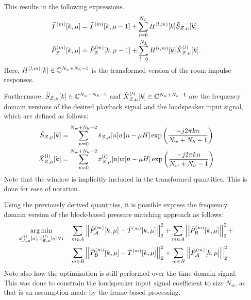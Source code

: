 This results in the following expressions.
\begin{align}
    \tilde{T}^{(m)}[k, \mu] &= \tilde{T}^{(m)}[k, \mu - 1] + \sum_{l=0}^{N_L}H^{(l,m)}[k]\tilde{S}_{\mathcal{Z},\mu}[k],\label{eq:perceptual_sound_zones:stft:t_freq} \\
    \tilde{P}_{\mathcal{Z}}^{(m)}[k, \mu] &= \tilde{P}_{\mathcal{Z}}^{(m)}[k, \mu - 1] 
        + \sum_{l=0}^{N_L}H^{(l,m)}[k]\tilde{X}^{(l)}_{\mathcal{Z},\mu}[k]. \label{eq:perceptual_sound_zones:stft:p_freq} 
\end{align}
Here, $H^{(l,m)}[k]\in\mathbb{C}^{N_w + N_h - 1}$ is the transformed version of the room impulse responses.

Furthermore, $\tilde{S}_{\mathcal{Z},\mu}[k]\in\mathbb{C}^{N_w + N_h - 1}$ and 
$\tilde{X}^{(l)}_{\mathcal{Z},\mu}[k]\in\mathbb{C}^{N_w + N_h - 1}$ are the frequency domain versions of
the desired playback signal and the loudspeaker input signal, which are defined as follows:
\begin{align}
    \tilde{S}_{\mathcal{Z},\mu}[k] &= \sum_{n=0}^{N_w + N_h - 2} \tilde{s}_{\mathcal{Z},\mu}[n]w[n - \mu H]
        \exp\left(\frac{-j2\pi k n}{N_w + N_h - 1}\right) \\
    \tilde{X}^{(l)}_{\mathcal{Z},\mu}[k] &= \sum_{n=0}^{N_w + N_h - 2} \tilde{x}^{(l)}_{\mathcal{Z},\mu}[n]w[n - \mu H]
        \exp\left(\frac{-j2\pi k n}{N_w + N_h - 1}\right)
\end{align}
Note that the window is implicitly included in the transformed quantities.
This is done for ease of notation.

Using the previously derived quantities, it is possible express the frequency domain version of the block-based pressure matching approach
as follows:
\begin{align}
    \begin{aligned}
    \argmin{\tilde{x}_{\za,\mu}^{(l)}[n],\,\tilde{x}_{\zb,\mu}^{(l)}[n]\,\forall\,l}{
       &\sum_{m\in A} \norm[2][2]{\tilde{P}_{\za}^{(m)}[k,\mu] - \tilde{T}^{(m)}[k,\mu]} +
        \sum_{m\in A} \norm[2][2]{\tilde{P}_{\zb}^{(m)}[k,\mu]} + \\
       &\sum_{m\in B} \norm[2][2]{\tilde{P}_{\zb}^{(m)}[k,\mu] - \tilde{T}^{(m)}[k,\mu]} + 
        \sum_{m\in B} \norm[2][2]{\tilde{P}_{\za}^{(m)}[k,\mu]}
    }
    \end{aligned}
    \label{eq:perceptual_sound_zone:stft:stft_pm}
\end{align}
Note also how the optimization is still performed over the time domain signal.
This was done to constrain the loudspeaker input signal coefficient to size $N_w$, 
as that is an assumption made by the frame-based processing.

